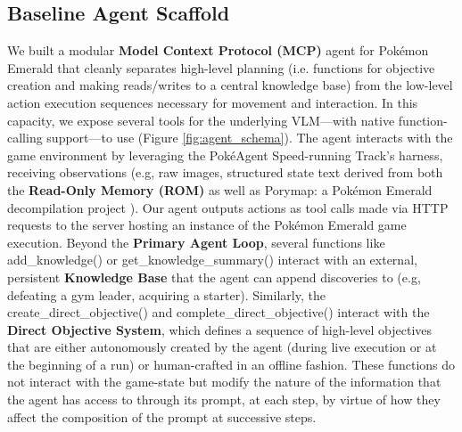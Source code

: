 \documentclass[11pt]{article}
\begin{document}
\subsection{Baseline Agent Scaffold}
We built a modular \textbf{Model Context Protocol (MCP)} agent for Pokémon Emerald that cleanly separates high-level planning (i.e. functions for objective creation and making reads/writes to a central knowledge base) from the low-level action execution sequences necessary for movement and interaction. In this capacity, we expose several tools for the underlying VLM---with native function-calling support---to use (Figure \ref{fig:agent_schema}). The agent interacts with the game environment by leveraging the PokéAgent Speed-running Track's harness, receiving observations (e.g, raw images, structured state text derived from both the \textbf{Read-Only Memory (ROM)} as well as Porymap: a Pokémon Emerald decompilation project \citep{huderlem2025porymap}). Our agent outputs actions as tool calls made via HTTP requests to the server hosting an instance of the Pokémon Emerald game execution. Beyond the \textbf{Primary Agent Loop}, several functions like add\_knowledge() or get\_knowledge\_summary() interact with an external, persistent \textbf{Knowledge Base} that the agent can append discoveries to (e.g, defeating a gym leader, acquiring a starter). Similarly, the create\_direct\_objective() and complete\_direct\_objective() interact with the \textbf{Direct Objective System}, which defines a sequence of high-level objectives that are either autonomously created by the agent (during live execution or at the beginning of a run) or human-crafted in an offline fashion. These functions do not interact with the game-state but modify the nature of the information that the agent has access to through its prompt, at each step, by virtue of how they affect the composition of the prompt at successive steps. 



    
\end{document}
